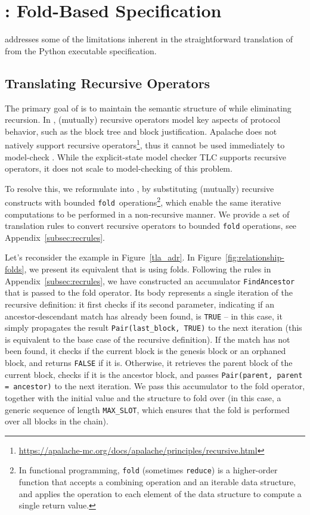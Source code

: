 
\section{\SpecTwo{}: Fold-Based Specification}\label{sec:spec2}

\SpecTwo{} addresses some of the limitations inherent in the straightforward
translation of \SpecOne{} from the Python executable specification.

\subsection{Translating Recursive \tlap{} Operators}

The primary goal of \SpecTwo{} is to maintain the semantic structure of
\SpecOne{} while eliminating recursion. In \SpecOne{}, (mutually) recursive
operators model key aspects of protocol behavior, such as the block tree and
block justification. Apalache does not natively support recursive
operators\footnote{\url{https://apalache-mc.org/docs/apalache/principles/recursive.html}},
thus it cannot be used immediately to model-check \SpecOne{}. While the
explicit-state \tlap{} model checker TLC supports recursive operators, it does
not scale to model-checking of this problem.

To resolve this, we reformulate \SpecOne{} into \SpecTwo{}, by substituting
(mutually) recursive constructs with bounded
\texttt{fold}~operations\footnote{In functional programming, \texttt{fold} (sometimes \texttt{reduce}) is a
higher-order function that accepts a combining operation and an iterable data
structure, and applies the operation to each element of the data structure
to compute a single return value.}, which enable the same iterative
computations to be performed in a non-recursive manner. We provide a set of
translation rules to convert recursive operators to bounded \texttt{fold}
operations, see Appendix~\ref{subsec:recrules}.

Let's reconsider the example in Figure~\ref{tla_adr}. In
Figure~\ref{fig:relationship-folds}, we present its equivalent that is using
folds. Following the rules in Appendix~\ref{subsec:recrules}, we have
constructed an accumulator \texttt{FindAncestor} that is passed to the fold
operator. Its body represents a single iteration of the recursive definition: it
first checks if its second parameter, indicating if an ancestor-descendant match
has already been found, is \texttt{TRUE} -- in this case, it simply propagates
the result \texttt{Pair(last\_block, TRUE)} to the next iteration (this is
equivalent to the base case of the recursive definition). If the match has not
been found, it checks if the current block is the genesis block or an orphaned
block, and returns \texttt{FALSE} if it is. Otherwise, it retrieves the parent
block of the current block, checks if it is the ancestor block, and passes
\texttt{Pair(parent, parent = ancestor)} to the next iteration. We pass this
accumulator to the fold operator, together with the initial value and the
structure to fold over (in this case, a generic sequence of length
\texttt{MAX\_SLOT}, which ensures that the fold is performed over all blocks in
the chain).


